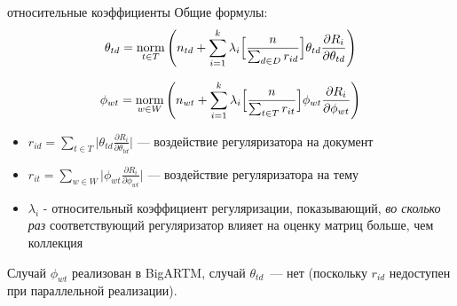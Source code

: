 \begin{frame}{относительные коэффициенты}
Общие формулы:
\[
\theta_{td} = \mathop{\mathrm{norm}}\limits_{t \in T} \Bigg(
    n_{td} + \sum_{i=1}^k \lambda_i \Big[
        \frac{n}{\sum_{d\in D} r_{id}}
        \Big]
    \theta_{td} \frac{\partial R_i}{\partial \theta_{td}}
\Bigg)
\]



\[
\phi_{wt} = \mathop{\mathrm{norm}}\limits_{w \in W}\Bigg(
    n_{wt} + \sum_{i=1}^k \lambda_i \Big[
        \frac{n}{\sum_{t\in T} r_{it}}
        \Big]
    \phi_{wt} \frac{\partial R_i}{\partial \phi_{wt}}
\Bigg)
\]

\small
\begin{itemize}
    \item { $r_{id} = \sum_{t\in T} \Big | \theta_{td} \frac{\partial R_i}{\partial \theta_{td}} \Big | $ --- воздействие регуляризатора на документ}

    \item{$r_{it} = \sum_{w\in W} \Big| \phi_{wt} \frac{\partial R_i}{\partial \phi_{wt}} \Big| $ --- воздействие регуляризатора на тему}
	\item { $\lambda_i$ - относительный коэффициент регуляризации, показывающий, \emph{во сколько раз} соответствующий регуляризатор влияет на оценку матриц больше, чем коллекция}
\end{itemize}

Случай $\phi_{wt}$ реализован в BigARTM, случай $\theta_{td}$~--- нет (поскольку $r_{id}$ недоступен при параллельной реализации).

\end{frame}

